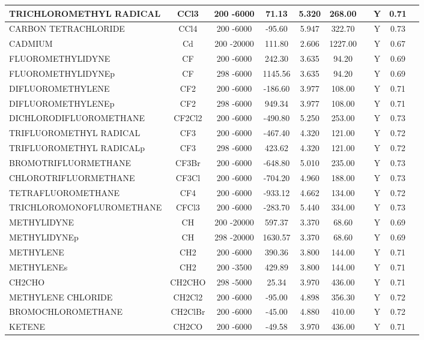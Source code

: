 \begin{longtable}{@{\extracolsep{\fill}}|l|c|c|c|c|c|c|c|c|l|}
TRICHLOROMETHYL RADICAL&CCl3&200 -6000&   71.13& 5.320&   268.00& &Y& 0.71&\\ \hline
CARBON TETRACHLORIDE&CCl4&200 -6000&  -95.60& 5.947&   322.70& &Y& 0.73&\\ \hline
CADMIUM&Cd&200 -20000&  111.80& 2.606&  1227.00& &Y& 0.67&\\ \hline
FLUOROMETHYLIDYNE&CF&200 -6000&  242.30& 3.635&    94.20& &Y& 0.69&\\ \hline
FLUOROMETHYLIDYNEp&CF&298 -6000& 1145.56& 3.635&    94.20& &Y& 0.69&\\ \hline
DIFLUOROMETHYLENE&CF2&200 -6000& -186.60& 3.977&   108.00& &Y& 0.71&\\ \hline
DIFLUOROMETHYLENEp&CF2&298 -6000&  949.34& 3.977&   108.00& &Y& 0.71&\\ \hline
DICHLORODIFLUOROMETHANE&CF2Cl2&200 -6000& -490.80& 5.250&   253.00& &Y& 0.73&\\ \hline
TRIFLUOROMETHYL RADICAL&CF3&200 -6000& -467.40& 4.320&   121.00& &Y& 0.72&\\ \hline
TRIFLUOROMETHYL RADICALp&CF3&298 -6000&  423.62& 4.320&   121.00& &Y& 0.72&\\ \hline
BROMOTRIFLUORMETHANE&CF3Br&200 -6000& -648.80& 5.010&   235.00& &Y& 0.73&\\ \hline
CHLOROTRIFLUORMETHANE&CF3Cl&200 -6000& -704.20& 4.960&   188.00& &Y& 0.73&\\ \hline
TETRAFLUOROMETHANE&CF4&200 -6000& -933.12& 4.662&   134.00& &Y& 0.72&\\ \hline
TRICHLOROMONOFLUROMETHANE&CFCl3&200 -6000& -283.70& 5.440&   334.00& &Y& 0.73&\\ \hline
METHYLIDYNE&CH&200 -20000&  597.37& 3.370&    68.60& &Y& 0.69&\\ \hline
METHYLIDYNEp&CH&298 -20000& 1630.57& 3.370&    68.60& &Y& 0.69&\\ \hline
METHYLENE&CH2&200 -6000&  390.36& 3.800&   144.00& &Y& 0.71&\\ \hline
METHYLENEs&CH2&200 -3500&  429.89& 3.800&   144.00& &Y& 0.71&\\ \hline
CH2CHO&CH2CHO&298 -5000&   25.34& 3.970&   436.00& &Y& 0.71&\\ \hline
METHYLENE CHLORIDE&CH2Cl2&200 -6000&  -95.00& 4.898&   356.30& &Y& 0.72&\\ \hline
BROMOCHLOROMETHANE&CH2ClBr&200 -6000&  -45.00& 4.880&   410.00& &Y& 0.72&\\ \hline
KETENE&CH2CO&200 -6000&  -49.58& 3.970&   436.00& &Y& 0.71&\\ \hline

\end{longtable}
